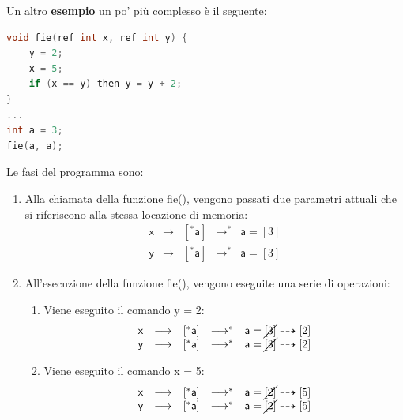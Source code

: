\documentclass[a4paper]{article}
\begin{document}
	\noindent
	Un altro \textcolor{Green4}{\textbf{esempio}} un po' più complesso è il seguente:
	\begin{lstlisting}[language=C]
void fie(ref int x, ref int y) {
	y = 2;
	x = 5;
	if (x == y) then y = y + 2;
}
...
int a = 3;
fie(a, a);\end{lstlisting}
	Le fasi del programma sono:
	\begin{enumerate}
		\item Alla chiamata della funzione \textsf{fie()}, vengono passati due parametri attuali che si riferiscono alla stessa locazione di memoria:
		\begin{equation*}
			\begin{array}{lllll}
				\textsf{x} &\longrightarrow& \left[^{*} \textsf{a}\right] &\longrightarrow^{*}& \textsf{a} = \left[3\right] \\
				\textsf{y} &\longrightarrow& \left[^{*} \textsf{a}\right] &\longrightarrow^{*}& \textsf{a} = \left[3\right]
			\end{array}
		\end{equation*}
		
		\item All'esecuzione della funzione \textsf{fie()}, vengono eseguite una serie di operazioni:
		\begin{enumerate}
			\item Viene eseguito il comando \textsf{y = 2}:
			\begin{equation*}
				\begin{array}{lllll}
					\textsf{x} &\longrightarrow& \left[^{*} \textsf{a}\right] &\longrightarrow^{*}& \textsf{a} = \cancel{\left[3\right]} \dashrightarrow \left[2\right] \\
					\textsf{y} &\longrightarrow& \left[^{*} \textsf{a}\right] &\longrightarrow^{*}& \textsf{a} = \cancel{\left[3\right]} \dashrightarrow \left[2\right]
				\end{array}
			\end{equation*}
			
			\item Viene eseguito il comando \textsf{x = 5}:
			\begin{equation*}
				\begin{array}{lllll}
					\textsf{x} &\longrightarrow& \left[^{*} \textsf{a}\right] &\longrightarrow^{*}& \textsf{a} = \cancel{\left[2\right]} \dashrightarrow \left[5\right] \\
					\textsf{y} &\longrightarrow& \left[^{*} \textsf{a}\right] &\longrightarrow^{*}& \textsf{a} = \cancel{\left[2\right]} \dashrightarrow \left[5\right]
				\end{array}
			\end{equation*}
			

\end{enumerate}
\end{enumerate}
\end{document}
